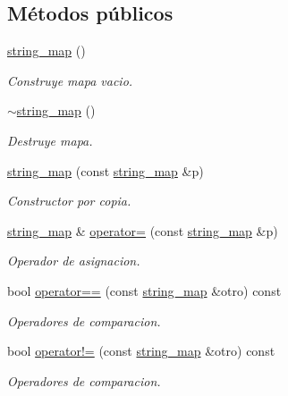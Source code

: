 \subsection*{Métodos públicos}
\begin{DoxyCompactItemize}
\item 
\mbox{\hyperlink{classstring__map_acd7803d493b09db56e2e9022e526def7}{string\+\_\+map}} ()
\begin{DoxyCompactList}\small\item\em Construye mapa vacio. \end{DoxyCompactList}\item 
\mbox{\hyperlink{classstring__map_a37b201370c0a6a3c2aa488dedbc0a9d7}{$\sim$string\+\_\+map}} ()
\begin{DoxyCompactList}\small\item\em Destruye mapa. \end{DoxyCompactList}\item 
\mbox{\hyperlink{classstring__map_a699366edd8a6d33bdc7977a42038822b}{string\+\_\+map}} (const \mbox{\hyperlink{classstring__map}{string\+\_\+map}} \&p)
\begin{DoxyCompactList}\small\item\em Constructor por copia. \end{DoxyCompactList}\item 
\mbox{\hyperlink{classstring__map}{string\+\_\+map}} \& \mbox{\hyperlink{classstring__map_a96848d5ec60072643cae6c412a8c2d8f}{operator=}} (const \mbox{\hyperlink{classstring__map}{string\+\_\+map}} \&p)
\begin{DoxyCompactList}\small\item\em Operador de asignacion. \end{DoxyCompactList}\item 
bool \mbox{\hyperlink{classstring__map_aadca3f9b617f66163f00982b88d3a368}{operator==}} (const \mbox{\hyperlink{classstring__map}{string\+\_\+map}} \&otro) const
\begin{DoxyCompactList}\small\item\em Operadores de comparacion. \end{DoxyCompactList}\item 
bool \mbox{\hyperlink{classstring__map_ac7db64d13d22674a2d53c8af469186fa}{operator!=}} (const \mbox{\hyperlink{classstring__map}{string\+\_\+map}} \&otro) const
\begin{DoxyCompactList}\small\item\em Operadores de comparacion. \end{DoxyCompactList}\item 

\end{DoxyCompactItemize}
